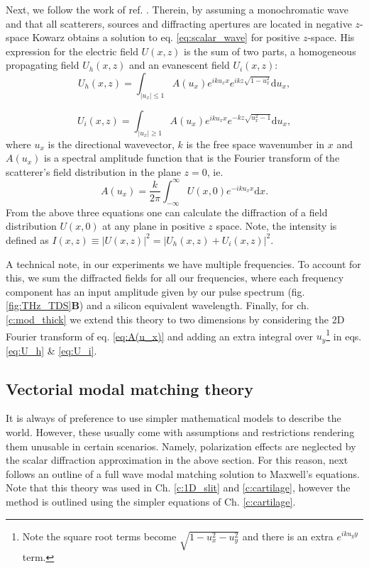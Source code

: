 Next, we follow the work of ref. \cite{scalar_near_fields}. Therein, by assuming a monochromatic wave and that all scatterers, sources and diffracting apertures are located in negative $z$-space Kowarz obtains a solution to eq. \eqref{eq:scalar_wave} for positive $z$-space. His expression for the electric field $U(x,z)$ is the sum of two parts, a homogeneous propagating field $U_h(x,z)$ and an evanescent field $U_i(x,z)$:
\begin{equation}
U_h(x,z) = \int_{|u_x| \leq 1 }A(u_x) e^{i k u_x x} e^{ikz\sqrt{1-u_x^2}}\text{d}u_x,
\label{eq:U_h}
\end{equation}

\begin{equation}
U_i(x,z) = \int_{|u_x| \geq 1 }A(u_x) e^{i k u_x x} e^{-kz\sqrt{u_x^2-1}}\text{d}u_x,
\label{eq:U_i}
\end{equation}
where $u_x$ is the directional wavevector, $k$ is the free space wavenumber in $x$ and $A(u_x)$ is a spectral amplitude function that is the Fourier transform of the scatterer's field distribution in the plane $z=0$, ie.
\begin{equation}
A(u_x) = \frac{k}{2\pi}\int_{-\infty}^{\infty} U(x,0) e^{-i k u_x x} \text{d}x.
\label{eq:A(u_x)}
\end{equation}
From the above three equations one can calculate the diffraction of a field distribution $U(x,0)$ at any plane in positive $z$ space. Note, the intensity is defined as $I(x,z)  \equiv |U(x,z)|^2 = |U_h(x,z) + U_i(x,z)|^2$. 

A technical note, in our experiments we have multiple frequencies. To account for this, we sum the diffracted fields for all our frequencies, where each frequency component has an input amplitude given by our pulse spectrum (fig. \ref{fig:THz_TDS}\textbf{B}) and a silicon equivalent wavelength. Finally, for ch. \ref{c:mod_thick} we extend this theory to two dimensions by considering the 2D Fourier transform of eq. \ref{eq:A(u_x)} and adding an extra integral over $u_y$\footnote{Note the square root terms become $\sqrt{1 - u_x^2 - u_y^2}$ and there is an extra $e^{iku_y y}$ term.} in eqs. \ref{eq:U_h} \& \ref{eq:U_i}.  



\subsection{Vectorial modal matching theory}\label{sec:modal_matching}
It is always of preference to use simpler mathematical models to describe the world. However, these usually come with assumptions and restrictions rendering them unusable in certain scenarios. Namely, polarization effects are neglected by the scalar diffraction approximation in the above section. For this reason, next follows an outline of a full wave modal matching solution to Maxwell's equations. Note that this theory was used in Ch. \ref{c:1D_slit} and \ref{c:cartilage}, however the method is outlined using the simpler equations of Ch. \ref{c:cartilage}.  

